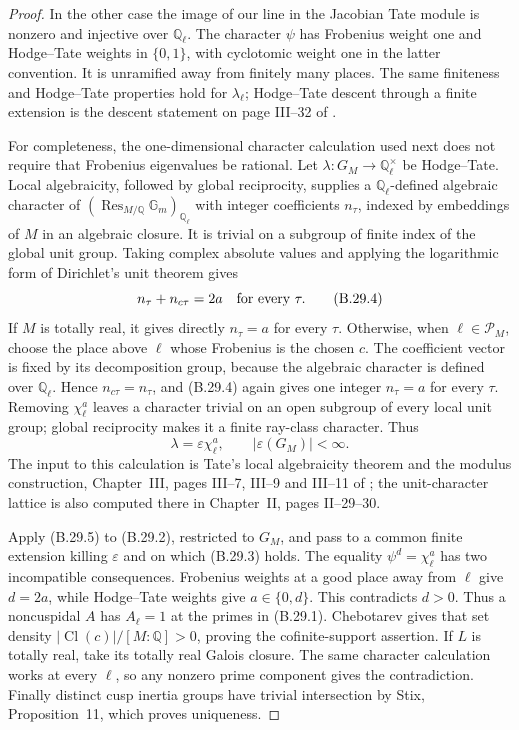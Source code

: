 \begin{proof}
In the other case the image of our line in the Jacobian Tate
module is nonzero and injective over $\mathbb Q_\ell$.
The character $\psi$ has Frobenius weight one and Hodge--Tate
weights in $\{0,1\}$, with cyclotomic weight one in the latter
convention.  It is unramified away from finitely many places.
The same finiteness and Hodge--Tate properties hold for
$\lambda_\ell$; Hodge--Tate descent through a finite extension
is the descent statement on page III--32 of
\cite{CESerreAbelian1989}.

For completeness, the one-dimensional character calculation
used next does not require that Frobenius eigenvalues be rational.
Let $\lambda:G_M\to\mathbb Q_\ell^\times$ be Hodge--Tate.
Local algebraicity, followed by global reciprocity, supplies a
$\mathbb Q_\ell$-defined algebraic character of
$(\operatorname{Res}_{M/\mathbb Q}\mathbb G_m)_{\mathbb Q_\ell}$
with integer coefficients $n_\tau$, indexed by embeddings of
$M$ in an algebraic closure.  It is trivial on a subgroup of
finite index of the global unit group.  Taking complex absolute
values and applying the logarithmic form of Dirichlet's unit
theorem gives
\[
             n_\tau+n_{c\tau}=2a\quad\hbox{for every }\tau. \tag{B.29.4}
\]
If $M$ is totally real, it gives directly $n_\tau=a$ for every
$\tau$.  Otherwise, when $\ell\in\mathcal P_M$, choose the place
above $\ell$ whose Frobenius is the chosen $c$.  The coefficient
vector is fixed by its decomposition group, because the
algebraic character is defined over $\mathbb Q_\ell$.
Hence $n_{c\tau}=n_\tau$, and (B.29.4) again gives one integer
$n_\tau=a$ for every $\tau$.  Removing $\chi_\ell^a$ leaves a
character trivial on an open subgroup of every local unit
group; global reciprocity makes it a finite ray-class character.
Thus
\[
                         \lambda=\varepsilon\chi_\ell^a,
                       \qquad |\varepsilon(G_M)|<\infty.  \tag{B.29.5}
\]
The input to this calculation is Tate's local algebraicity
theorem and the modulus construction, Chapter~III,
pages III--7, III--9 and III--11 of
\cite{CESerreAbelian1989}; the unit-character lattice is
also computed there in Chapter~II, pages II--29--30.

Apply (B.29.5) to (B.29.2), restricted to $G_M$, and pass
to a common finite extension killing $\varepsilon$ and on which
(B.29.3) holds.  The equality $\psi^d=\chi_\ell^a$ has two
incompatible consequences.  Frobenius weights at a good
place away from $\ell$ give $d=2a$, while Hodge--Tate weights
give $a\in\{0,d\}$.  This contradicts $d>0$.  Thus a
noncuspidal $A$ has $A_\ell=1$ at the primes in (B.29.1).
Chebotarev gives that set density
$|\operatorname{Cl}(c)|/[M:\mathbb Q]>0$, proving the
cofinite-support assertion.  If $L$ is totally real, take its
totally real Galois closure.  The same character calculation
works at every $\ell$, so any nonzero prime component gives
the contradiction.  Finally distinct cusp inertia groups
have trivial intersection by Stix, Proposition~11, which
proves uniqueness.
\end{proof}

